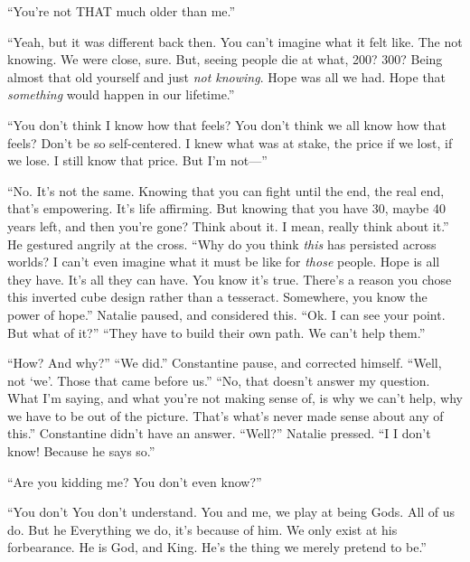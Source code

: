 “You’re not THAT much older than me.”

“Yeah, but it was different back then. You can’t imagine what it felt like. The not knowing. We were close, sure. But, seeing people die at what, 200? 300? Being almost that old yourself and just \emph{not knowing}. Hope was all we had. Hope that \emph{something} would happen in our lifetime.”

“You don’t think I know how that feels? You don’t think we all know how that feels? Don’t be so self-centered. I knew what was at stake, the price if we lost, if we lose. I still know that price. But I’m not\mbox{---}”

“No. It’s not the same. Knowing that you can fight until the end, the real end, that’s empowering. It’s life affirming. But knowing that you have 30, maybe 40 years left, and then you’re gone? Think about it. I mean, really think about it.” He gestured angrily at the cross. “Why do you think \emph{this} has persisted across worlds? I can’t even imagine what it must be like for \emph{those} people. Hope is all they have. It’s all they can have. You know it’s true. There’s a reason you chose this inverted cube design rather than a tesseract. Somewhere, you know the power of hope.”
\SomeVSpace
Natalie paused, and considered this. “Ok. I can see your point. But what of it?”
\SomeVSpace
“They have to build their own path. We can’t help them.”

“How? And why?”
\SmallVSpace
“We did.” Constantine pause, and corrected himself. “Well, not ‘we’. Those that came before us.”
\SmallVSpace
“No, that doesn’t answer my question. What I’m saying, and what you’re not making sense of, is why we can’t help, why we have to be out of the picture. That’s what’s never made sense about any of this.”
\SmallVSpace
Constantine didn’t have an answer. “Well?” Natalie pressed.
\SmallVSpace
“I{\el} I don’t know! Because he says so.”

“Are you kidding me? You don’t even know?”

“You don’t{\el} You don’t understand. You and me, we play at being Gods. All of us do. But he{\el} Everything we do, it’s because of him. We only exist at his forbearance. He is God, and King. He’s the thing we merely pretend to be.”

